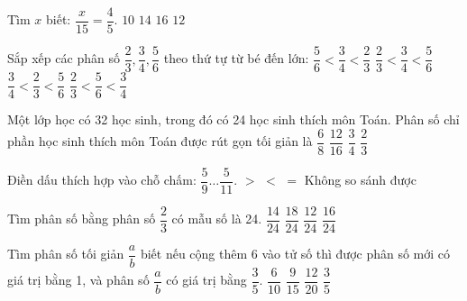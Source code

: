 \begin{ex} %
Tìm $x$ biết: $\dfrac{x}{15} = \dfrac{4}{5}$.
\choice
{$10$}
{$14$}
{$16$}
{\True $12$}
\end{ex}

\begin{ex} %
Sắp xếp các phân số $\dfrac{2}{3}, \dfrac{3}{4}, \dfrac{5}{6}$ theo thứ tự từ bé đến lớn:
\choice
{$\dfrac{5}{6} < \dfrac{3}{4} < \dfrac{2}{3}$}
{\True $\dfrac{2}{3} < \dfrac{3}{4} < \dfrac{5}{6}$}
{$\dfrac{3}{4} < \dfrac{2}{3} < \dfrac{5}{6}$}
{$\dfrac{2}{3} < \dfrac{5}{6} < \dfrac{3}{4}$}
\end{ex}

\begin{ex} %
Một lớp học có 32 học sinh, trong đó có 24 học sinh thích môn Toán. Phân số chỉ phần học sinh thích môn Toán được rút gọn tối giản là
\choice
{$\dfrac{6}{8}$}
{$\dfrac{12}{16}$}
{\True $\dfrac{3}{4}$}
{$\dfrac{2}{3}$}
\end{ex}

\begin{ex} %
Điền dấu thích hợp vào chỗ chấm: $\dfrac{5}{9} \dots \dfrac{5}{11}$.
\choice
{\True $>$}
{$<$}
{$=$}
{Không so sánh được}
\end{ex}

\begin{ex} %
Tìm phân số bằng phân số $\dfrac{2}{3}$ có mẫu số là 24.
\choice
{$\dfrac{14}{24}$}
{$\dfrac{18}{24}$}
{$\dfrac{12}{24}$}
{\True $\dfrac{16}{24}$}
\end{ex}

\begin{ex} %
Tìm phân số tối giản $\dfrac{a}{b}$ biết nếu cộng thêm 6 vào tử số thì được phân số mới có giá trị bằng 1, và phân số $\dfrac{a}{b}$ có giá trị bằng $\dfrac{3}{5}$.
\choice
{$\dfrac{6}{10}$}
{\True $\dfrac{9}{15}$}
{$\dfrac{12}{20}$}
{$\dfrac{3}{5}$}
\end{ex}

